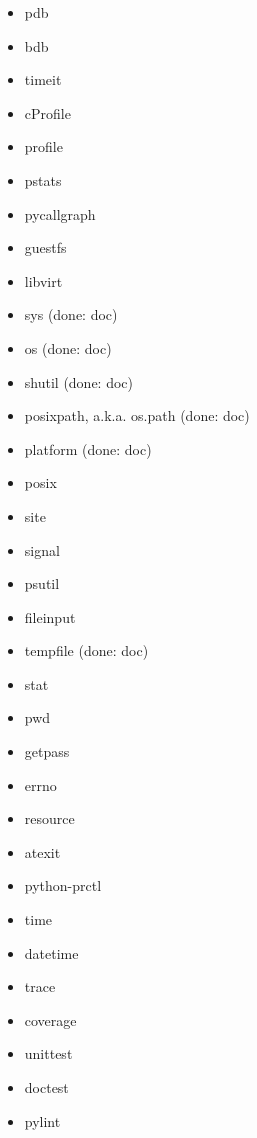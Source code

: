 \documentclass{article}
\begin{document}
\begin{enumerate}
\begin{itemize}
            \item pdb
            \item bdb
            \item timeit
            \item cProfile
            \item profile
            \item pstats
            \item pycallgraph

            \item guestfs
            \item libvirt

            \item sys (done: doc)
            \item os (done: doc)
            \item shutil (done: doc)
            \item posixpath, a.k.a. os.path (done: doc)
            \item platform (done: doc)
            \item posix
            \item site
            \item signal
            \item psutil
            \item fileinput
            \item tempfile (done: doc)
            \item stat
            \item pwd
            \item getpass
            \item errno
            \item resource
            \item atexit
            \item python-prctl

            \item time
            \item datetime

            \item trace
            \item coverage
            \item unittest
            \item doctest

            \item pylint


\end{itemize}
\end{enumerate}
\end{document}
